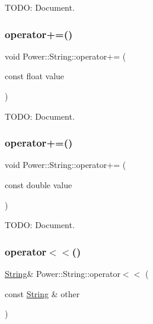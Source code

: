 T\+O\+DO\+: Document. 

\mbox{\label{class_power_1_1_string_a9ac2eb1de5bf6a9232e85abbcb4c9bf2}} 
\subsubsection{\texorpdfstring{operator+=()}{operator+=()}\hspace{0.1cm}{\footnotesize\ttfamily [10/11]}}
{\footnotesize\ttfamily void Power\+::\+String\+::operator+= (\begin{DoxyParamCaption}\item[{const float}]{value }\end{DoxyParamCaption})\hspace{0.3cm}{\ttfamily [inline]}}



T\+O\+DO\+: Document. 

\mbox{\label{class_power_1_1_string_a8689efc9a824d938249a78f02918e57d}} 
\subsubsection{\texorpdfstring{operator+=()}{operator+=()}\hspace{0.1cm}{\footnotesize\ttfamily [11/11]}}
{\footnotesize\ttfamily void Power\+::\+String\+::operator+= (\begin{DoxyParamCaption}\item[{const double}]{value }\end{DoxyParamCaption})\hspace{0.3cm}{\ttfamily [inline]}}



T\+O\+DO\+: Document. 

\mbox{\label{class_power_1_1_string_a0e79c36bc1ac080cdc9bbe491cea5b32}} 
\subsubsection{\texorpdfstring{operator$<$$<$()}{operator<<()}\hspace{0.1cm}{\footnotesize\ttfamily [1/3]}}
{\footnotesize\ttfamily \hyperlink{class_power_1_1_string}{String}\& Power\+::\+String\+::operator$<$$<$ (\begin{DoxyParamCaption}\item[{const \hyperlink{class_power_1_1_string}{String} \&}]{other }\end{DoxyParamCaption})\hspace{0.3cm}{\ttfamily [inline]}}




